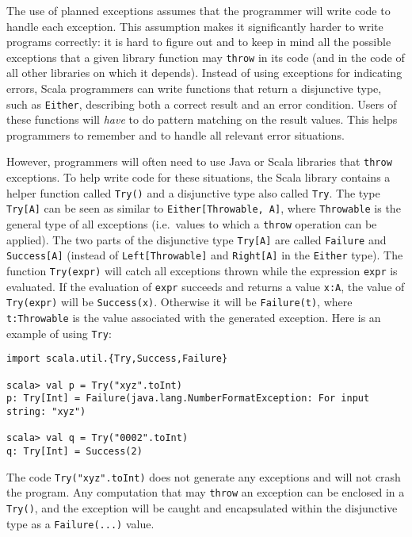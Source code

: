 The use of planned exceptions assumes that the programmer will write
code to handle each exception. This assumption makes it significantly
harder to write programs correctly: it is hard to figure out and to
keep in mind all the possible exceptions that a given library function
may \lstinline!throw! in its code (and in the code of all other libraries
on which it depends). Instead of using exceptions for indicating errors,
Scala programmers can write functions that return a disjunctive type,
such as \lstinline!Either!, describing both a correct result and
an error condition. Users of these functions will \emph{have} to do
pattern matching on the result values. This helps programmers to remember
and to handle all relevant error situations.

However, programmers will often need to use Java or Scala libraries
that \lstinline!throw! exceptions. To help write code for these situations,
the Scala library contains a helper function called \lstinline!Try()!
and a disjunctive type also called \lstinline!Try!. The type \lstinline!Try[A]!
can be seen as similar to \lstinline!Either[Throwable, A]!, where
\lstinline!Throwable! is the general type of all exceptions (i.e.~values
to which a \lstinline!throw! operation can be applied). The two parts
of the disjunctive type \lstinline!Try[A]! are called \lstinline!Failure!
and \lstinline!Success[A]! (instead of \lstinline!Left[Throwable]!
and \lstinline!Right[A]! in the \lstinline!Either! type). The function
\lstinline!Try(expr)! will catch all exceptions thrown while the
expression \lstinline!expr! is evaluated. If the evaluation of \lstinline!expr!
succeeds and returns a value \lstinline!x:A!, the value of \lstinline!Try(expr)!
will be \lstinline!Success(x)!. Otherwise it will be \lstinline!Failure(t)!,
where \lstinline!t:Throwable! is the value associated with the generated
exception. Here is an example of using \lstinline!Try!:
\begin{lstlisting}
import scala.util.{Try,Success,Failure}

scala> val p = Try("xyz".toInt)
p: Try[Int] = Failure(java.lang.NumberFormatException: For input string: "xyz")

scala> val q = Try("0002".toInt)
q: Try[Int] = Success(2) 
\end{lstlisting}
The code \lstinline!Try("xyz".toInt)! does not generate any exceptions
and will not crash the program. Any computation that may \lstinline!throw!
an exception can be enclosed in a \lstinline!Try()!, and the exception
will be caught and encapsulated within the disjunctive type as a \lstinline!Failure(...)!
value.

